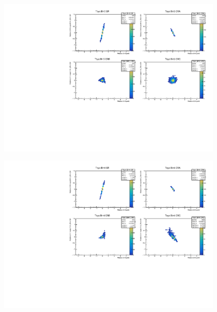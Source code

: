 \begin{figure}[H]
\includegraphics[width=\textwidth]{plots/diffx/instab/linearfx/instabilities_mjj_QCD_Sh2211_Signal_Sh2211_BSDATASTATS_linearfx_newbinning_sherpaasimov_bin3.pdf}
\end{figure}
\begin{figure}[H]
\includegraphics[width=\textwidth]{plots/diffx/instab/linearfx/instabilities_mjj_QCD_Sh2211_Signal_Sh2211_BSDATASTATS_linearfx_newbinning_sherpaasimov_bin4.pdf}
\end{figure}


